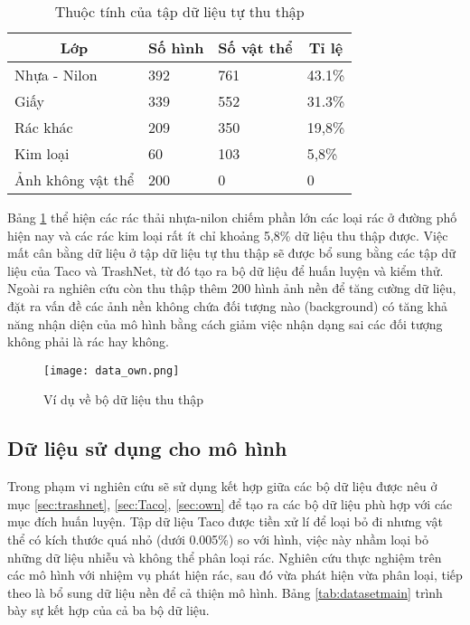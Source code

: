 \documentclass[../the.tex]{subfiles}
\begin{document}
\begin{table}[!ht]
	\centering
	\caption{Thuộc tính của tập dữ liệu tự thu thập}
	\begin{tabular}{|l|l|l|l|}
		\hline
		 \multicolumn{1}{|c|}{\textbf{Lớp}}
		 & \multicolumn{1}{c|}{\textbf{Số hình}} 
		 & \multicolumn{1}{c|}{\textbf{Số vật thể}}
		 & \multicolumn{1}{c|}{\textbf{Tỉ lệ}}
		  \\
		\hline

		  Nhựa - Nilon & 392 & 761 & 43.1\%  \\
		\hline

			Giấy & 339 & 552   & 31.3\%                                        \\
		\hline

		 Rác khác & 209 & 350   & 19,8\%                                        \\
		\hline

		 Kim loại & 60 & 103    & 5,8\%                                         \\
		\hline
		 Ảnh không vật thể & 200 & 0   & 0                                         \\
		\hline

	\end{tabular}

	\label{tab:datasetown}
\end{table}

{\fontsize{13}{12} \selectfont
Bảng \ref{tab:datasetown} thể hiện các rác thải nhựa-nilon chiếm phần lớn các loại rác ở đường phố hiện nay và các rác kim loại rất ít chỉ khoảng 5,8\% dữ liệu thu thập được.
Việc mất cân bằng dữ liệu ở tập dữ liệu tự thu thập sẽ được bổ sung bằng các tập dữ liệu của Taco và TrashNet, từ đó tạo ra bộ dữ liệu để huấn luyện và kiểm thử.
Ngoài ra nghiên cứu còn thu thập thêm 200 hình ảnh nền để tăng cường dữ liệu, đặt ra vấn đề các ảnh nền không chứa đối tượng nào (background) có tăng khả năng nhận diện của mô hình bằng cách giảm việc nhận dạng sai các đối tượng không phải là rác hay không.
}


\begin{figure}[H]
	\centering
	\texttt{[image: data\_own.png]}
	\caption{Ví dụ về bộ dữ liệu thu thập}
	\label{fig:dataset_own}
\end{figure}

\subsection{Dữ liệu sử dụng cho mô hình}
{\fontsize{13}{12} \selectfont 
Trong phạm vi nghiên cứu sẽ sử dụng kết hợp giữa các bộ dữ liệu được nêu ở mục \ref{sec:trashnet}, \ref{sec:Taco}, \ref{sec:own} để tạo ra các bộ dữ liệu phù hợp với các mục đích huấn luyện.
Tập dữ liệu Taco được tiền xử lí để loại bỏ đi nhưng vật thể có kích thước quá nhỏ (dưới 0.005\%) so với hình, việc này nhầm loại bỏ những dữ liệu nhiễu và không thể phân loại rác.
Nghiên cứu thực nghiệm trên các mô hình với nhiệm vụ phát hiện rác, sau đó vừa phát hiện vừa phân loại, tiếp theo là bổ sung dữ liệu nền để cả thiện mô hình.
Bảng \ref{tab:datasetmain} trình bày sự kết hợp của cả ba bộ dữ liệu. 
}
\end{document}
